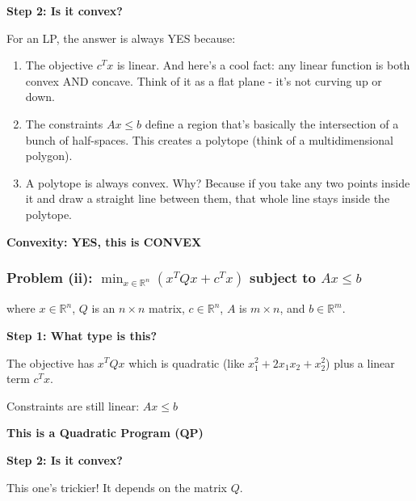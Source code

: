 \documentclass[11pt]{article}
\newenvironment{answerbox}
  {\begin{framed}\begin{center}\large\bfseries}
  {\end{center}\end{framed}}
\begin{document}
\vspace{0.5em}

\textbf{Step 2: Is it convex?}

For an LP, the answer is always YES because:

\begin{enumerate}
\item The objective $c^T x$ is linear. And here's a cool fact: any linear function is both convex AND concave. Think of it as a flat plane - it's not curving up or down.

\item The constraints $Ax \leq b$ define a region that's basically the intersection of a bunch of half-spaces. This creates a polytope (think of a multidimensional polygon). 

\item A polytope is always convex. Why? Because if you take any two points inside it and draw a straight line between them, that whole line stays inside the polytope.
\end{enumerate}

\begin{answerbox}
\textbf{Convexity:} YES, this is CONVEX
\end{answerbox}

\vspace{1em}

\subsubsection{Problem (ii): $\min_{x \in \mathbb{R}^n} (x^T Q x + c^T x)$ subject to $Ax \leq b$}

where $x \in \mathbb{R}^n$, $Q$ is an $n \times n$ matrix, $c \in \mathbb{R}^n$, $A$ is $m \times n$, and $b \in \mathbb{R}^m$.

\textbf{Step 1: What type is this?}

The objective has $x^T Q x$ which is quadratic (like $x_1^2 + 2x_1 x_2 + x_2^2$) plus a linear term $c^T x$.

Constraints are still linear: $Ax \leq b$

\begin{answerbox}
This is a \textbf{Quadratic Program (QP)}
\end{answerbox}

\vspace{0.5em}

\textbf{Step 2: Is it convex?}

This one's trickier! It depends on the matrix $Q$.
\end{document}
